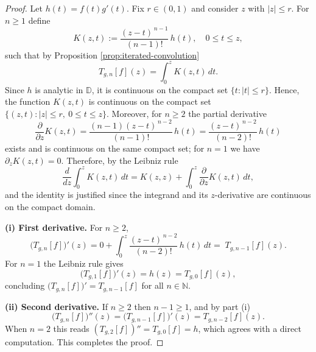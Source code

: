 \documentclass[10pt,a4paper]{amsart}
\newcommand{\D}{\mathbb{D}}
\begin{document}
\begin{proof}
Let \(h(t)=f(t)g'(t)\). Fix \(r\in(0,1)\) and consider \(z\) with \(|z|\le r\). For \(n\ge1\) define
\[
K(z,t):=\frac{(z-t)^{\,n-1}}{(n-1)!}\,h(t),\quad 0\le t\le z,
\]
such that by Proposition \ref{prop:iterated-convolution}
\[
T_{g,n}[f](z)=\int_0^z K(z,t)\,dt.
\]
Since \(h\) is analytic in \(\D\), it is continuous on the compact set
\(\{t: |t|\le r\}\). Hence, the function
\(K(z,t)\) is continuous on the compact set
\(\{(z,t): |z|\le r,\ 0\le t\le z\}\). Moreover, for \(n\ge2\) the partial derivative
\[
\frac{\partial}{\partial z}K(z,t)=\frac{(n-1)(z-t)^{\,n-2}}{(n-1)!}\,h(t)
=\frac{(z-t)^{\,n-2}}{(n-2)!}\,h(t)
\]
exists and is continuous on the same compact set; for \(n=1\) we have \(\partial_z K(z,t)=0\).
Therefore, by the Leibniz rule 
\[
\frac{d}{dz}\int_0^z K(z,t)\,dt
=K(z,z)+\int_0^z \frac{\partial}{\partial z}K(z,t)\,dt,
\]
and the identity is justified since the integrand and its \(z\)-derivative are continuous on the compact domain.

\medskip
\noindent\textbf{(i) First derivative.} For \(n\ge2\),
\[
\bigl(T_{g,n}[f]\bigr)'(z)
=0+\int_0^z \frac{(z-t)^{\,n-2}}{(n-2)!}\,h(t)\,dt
=\;T_{g,n-1}[f](z).
\]
For \(n=1\) the Leibniz rule gives
\[
\bigl(T_{g,1}[f]\bigr)'(z)=h(z)=T_{g,0}[f](z),
\]
concluding \(\bigl(T_{g,n}[f]\bigr)'=T_{g,n-1}[f]\) for all $n\in\mathbb N$.

\medskip
\noindent\textbf{(ii) Second derivative.} If \(n\ge2\) then \(n-1\ge1\), and by part (i)
\[
\bigl(T_{g,n}[f]\bigr)''(z)
=\bigl(T_{g,n-1}[f]\bigr)'(z)
= T_{g,n-2}[f](z).
\]
When \(n=2\) this reads \((T_{g,2}[f])''=T_{g,0}[f]=h\), which agrees with a direct computation.
This completes the proof.
\end{proof}
\end{document}
